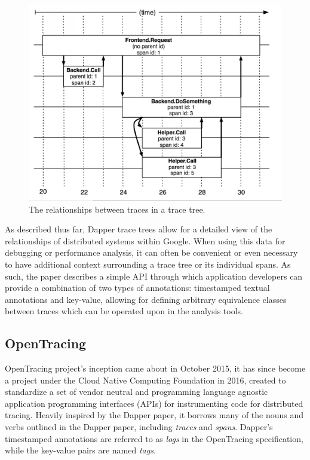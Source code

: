 \documentclass[12pt,pdftex,titlepage]{report}
\begin{document}
                \begin{figure}[htb!]
                    \centering
                    \includegraphics[scale=1]{dappertrace.png}
                    \caption{The relationships between traces in a trace tree.}
                    \label{fig:dappertrace}
                \end{figure}

                As described thus far, Dapper trace trees allow for a detailed view of the relationships of distributed systems within
                Google. When using this data for debugging or performance analysis, it can often be convenient or even necessary to 
                have additional context surrounding a trace tree or its individual spans. As such, the paper describes a simple API 
                through which application developers can provide a combination of two types of annotations: timestamped textual annotations
                and key-value, allowing for defining arbitrary equivalence classes between traces which can be operated upon in the analysis
                tools.

            \subsection{OpenTracing}
                OpenTracing\cite{opentracing} project's inception came about in October 2015, it has since become a project under the 
                Cloud Native Computing Foundation in 2016, created to standardize a set of vendor neutral and programming language agnostic
                application programming interfaces (APIs) for instrumenting code for distributed tracing. Heavily inspired by the Dapper
                paper, it borrows many of the nouns and verbs outlined in the Dapper paper, including \textit{traces} and \textit{spans}.
                Dapper's timestamped annotations are referred to as \textit{logs} in the OpenTracing specification, while the key-value pairs
                are named \textit{tags}. 
\end{document}
